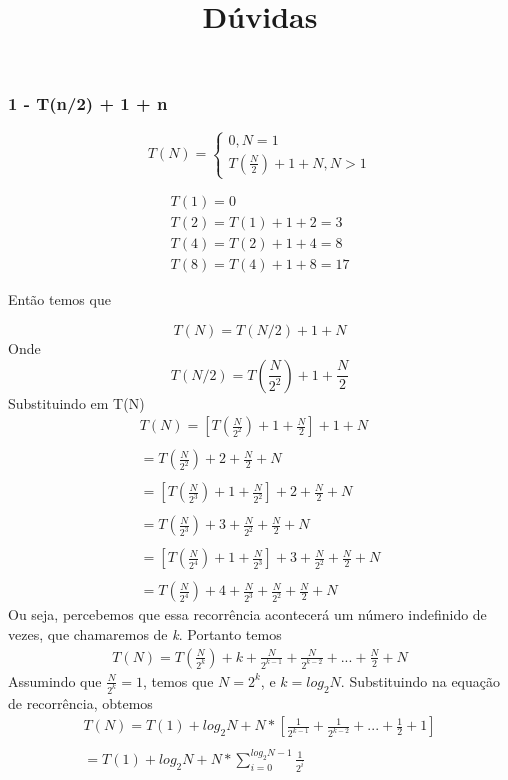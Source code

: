 \documentclass[
]{article}
\title{Dúvidas}
\author{}
\date{\vspace{-2.5em}}
\begin{document}
\maketitle

\hypertarget{tn2-1-n}{%
\subsubsection{1 - T(n/2) + 1 + n}\label{tn2-1-n}}

\[  
T(N) = \begin{cases} 0, N=1\\T(\frac{N}{2}) + 1 + N, N>1 \end{cases} 
\]

\[\begin{aligned}
T(1) = 0
\\
T(2) = T(1) + 1 + 2 = 3
\\
T(4) = T(2) + 1 + 4 = 8
\\
T(8) = T(4) + 1 + 8 = 17
\end{aligned}\]

Então temos que

\[
T(N) = T(N/2) + 1 + N
\] Onde \[
T(N/2) = T(\frac{N}{2^2}) + 1 + \frac{N}{2}
\] Substituindo em T(N) \[\begin{aligned}
T(N) = [T(\frac{N}{2^2}) + 1 + \frac{N}{2}] + 1 + N
\\\\
= T(\frac{N}{2^2}) + 2 + \frac{N}{2} + N
\\\\
= [T(\frac{N}{2^3}) + 1 + \frac{N}{2^2}] + 2 + \frac{N}{2} + N
\\\\
= T( \frac{N}{2^3}) + 3 + \frac{N}{2^2} +  \frac{N}{2} + N
\\\\
= [T(\frac{N}{2^4}) + 1 + \frac{N}{2^3}] + 3 + \frac{N}{2^2} +  \frac{N}{2} + N
\\\\
= T(\frac{N}{2^4}) + 4 + \frac{N}{2^3} +  \frac{N}{2^2} +  \frac{N}{2} + N
\end{aligned}\] Ou seja, percebemos que essa recorrência acontecerá um
número indefinido de vezes, que chamaremos de \emph{k}. Portanto temos
\[\begin{aligned}
T(N) = T(\frac{N}{2^k}) + k + \frac{N}{2^{k-1}} + \frac{N}{2^{k-2}} + ... + \frac{N}{2} + N
\end{aligned}\] Assumindo que \(\frac{N}{2^k} = 1\), temos que
\(N = 2^k\), e \(k = log_2{N}\). Substituindo na equação de recorrência,
obtemos \[\begin{align}
T(N) = T(1) + log_2{N} + N*[\frac{1}{2^{k-1}} + \frac{1}{2^{k-2}} + ... + \frac{1}{2} + 1]
\\\\
= T(1) + log_2{N} + N*\sum_{i=0}^{log_2{N}-1} \frac{1}{2^i}
\end{align}\]
\end{document}
